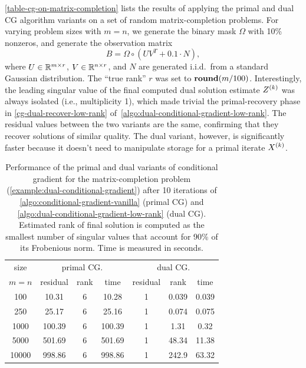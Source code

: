 \begin{example}
  \autoref{table-cg-on-matrix-completion} lists the results of applying the primal
  and dual CG algorithm variants on a set of random matrix-completion problems.
  For varying problem sizes with $m=n$, we generate the binary mask $\Omega$
  with 10\% nonzeros, and generate the observation matrix
  \[
    B = \Omega\circ(UV^T+0.1\cdot N), 
  \]
  where $U\in\mathbb{R}^{m\times r}$, $V\in\mathbb{R}^{n\times r}$, and $N$ are generated
  i.i.d.~from a standard Gaussian distribution. The ``true rank'' $r$ was set to
  $\mathop{\bf round}(m/100)$. Interestingly, the leading singular value of the
  final computed dual solution estimate $Z^{(k)}$ was always isolated (i.e.,
  multiplicity 1), which made trivial the primal-recovery phase in
  \autoref{cg-dual-recover-low-rank}
  of~\autoref{algo:dual-conditional-gradient-low-rank}. The residual values between
  the two variants are the same, confirming that they recover solutions of
  similar quality. The dual variant, however, is significantly faster because it
  doesn't need to manipulate storage for a primal iterate $X^{(k)}$.
  
  \begin{table}[hb]
    \centering
    \begin{tabular}{ccccccc}
        \toprule
        size & \multicolumn{3}{c}{primal CG.} & \multicolumn{3}{c}{dual CG.}\\
        \cmidrule(lr){1-1}\cmidrule(lr){2-4}\cmidrule(lr){5-7}
        $m=n$ & residual & rank & time & residual & rank & time \\ 
        \hline
        100      &10.31  &6     &10.28 &1     &0.039    &0.039 \\
        250      &25.17  &6     &25.16 &1     &0.074    &0.075 \\
        1000    &100.39  &6    &100.39 &1     &1.31     &0.32 \\
        5000    &501.69  &6    &501.69 &1    &48.34    &11.38 \\
        10000   &998.86  &6    &998.86 &1   &242.9     &63.32 \\
        \bottomrule
    \end{tabular}
      \caption{Performance of the primal and dual variants of conditional gradient
      for the matrix-completion problem
      (\autoref{example:dual-conditional-gradient})
      after 10 iterations of
      \autoref{algo:conditional-gradient-vanilla} (primal CG) and
         \autoref{algo:dual-conditional-gradient-low-rank} (dual CG). Estimated rank of final
         solution is computed as the smallest number of singular values that
         account for 90\% of its Frobenious norm. Time is measured in
         seconds.}
      \label{table-cg-on-matrix-completion}
  \end{table}
  
\end{example}


